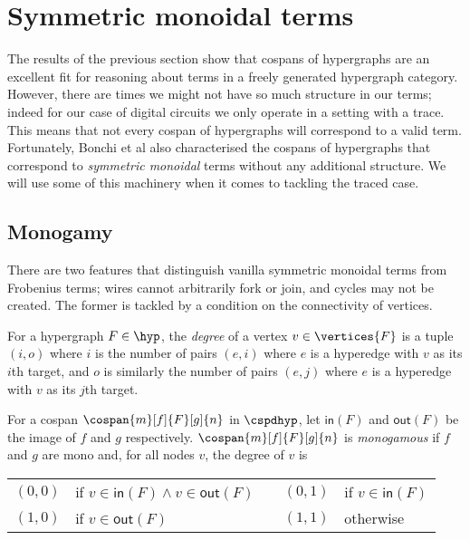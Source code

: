\section{Symmetric monoidal terms}

The results of the previous section show that cospans of hypergraphs are an
excellent fit for reasoning about terms in a freely generated hypergraph
category.
However, there are times we might not have so much structure in our terms;
indeed for our case of digital circuits we only operate in a setting with a
trace.
This means that not every cospan of hypergraphs will correspond to a valid term.
Fortunately, Bonchi et al also characterised the cospans of hypergraphs that
correspond to \emph{symmetric monoidal} terms without any additional structure.
We will use some of this machinery when it comes to tackling the traced case.

\subsection{Monogamy}

There are two features that distinguish vanilla symmetric monoidal terms from
Frobenius terms; wires cannot arbitrarily fork or join, and cycles may not be
created.
The former is tackled by a condition on the connectivity of vertices.

\begin{definition}
    For a hypergraph \(F \in \hyp\), the \emph{degree} of a vertex
    \(v \in \vertices{F}\) is a tuple \((i,o)\) where \(i\) is the number of
    pairs \((e,i)\) where \(e\) is a hyperedge with \(v\) as its \(i\)th target,
    and \(o\) is similarly the number of pairs \((e,j)\) where \(e\) is a
    hyperedge with \(v\) as its \(j\)th target.
\end{definition}

\begin{definition}
    For a cospan \(\cospan{m}[f]{F}[g]{n}\) in
    \(\cspdhyp\), let \(\mathsf{in}(F)\) and \(\mathsf{out}(F)\) be the image of
    \(f\) and \(g\) respectively.
    \(\cospan{m}[f]{F}[g]{n}\) is \emph{monogamous} if \(f\) and \(g\) are mono
    and, for all nodes \(v\), the degree of \(v\) is
    \begin{center}
        \begin{tabular}{rlcrl}
            \((0,0)\)
             &
            if \(v \in \mathsf{in}(F) \wedge v \in \mathsf{out}(F)\)
             &
            \quad
             &
            \((0,1)\)
             &
            if \(v \in \mathsf{in}(F)\)
            \\
            \((1,0)\)
             &
            if \(v \in \mathsf{out}(F)\)
             &
            \quad
             &
            \((1,1)\)
             &
            otherwise
        \end{tabular}
    \end{center}
\end{definition}

